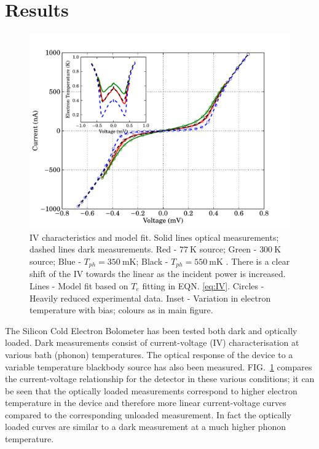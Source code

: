 \documentclass[aip, apl, a4paper, amsmath,amssymb, reprint]{revtex4-1}
\begin{document}
\section{Results} \label{sec:Results}
\begin{figure}[ht]
\includegraphics[width = 0.8\columnwidth]{01_IVs_APL}
\caption{IV characteristics and model fit. Solid lines optical measurements; dashed lines dark measurements. Red - $77~\mathrm{K}$ source; Green - $300~\mathrm{K}$ source; Blue - $T_{ph} = 350~\mathrm{mK}$; Black - $T_{ph} = 550~\mathrm{mK}$ . There is a clear shift of the IV towards the linear as the incident power is increased. Lines - Model fit based on $T_{e}$ fitting in EQN. \ref{eq:IV}. Circles - Heavily reduced experimental data. Inset - Variation in electron temperature with bias; colours as in main figure.}
\label{fig:IV_data_model}
\end{figure}
The Silicon Cold Electron Bolometer has been tested both dark and optically loaded. Dark measurements consist of current-voltage (IV) characterisation at various bath (phonon) temperatures. The optical response of the device to a variable temperature blackbody source has also been measured. FIG.~\ref{fig:IV_data_model} compares the current-voltage relationship for the detector in these various conditions; it can be seen that the optically loaded measurements correspond to higher electron temperature in the device and therefore more linear current-voltage curves compared to the corresponding unloaded measurement. In fact the optically loaded curves are similar to a dark measurement at a much higher phonon temperature.
\end{document}
